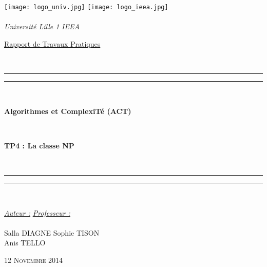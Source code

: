 \thispagestyle{cover}

\texttt{[image: logo\_univ.jpg]} \hfill \texttt{[image: logo\_ieea.jpg]} \\
~\\
\hspace*{0.5cm} {\Large \textit{Université Lille 1}} \hfill {\Large \textit{IEEA}} \hspace*{0.5cm}\\

\vspace*{17mm}

\begin{center}
	\begin{Huge} \underline{Rapport de Travaux Pratiques} \end{Huge}\\[4mm]

	\vspace*{15mm}

	\rule[0.5ex]{\linewidth}{2pt}\vspace*{-\baselineskip}\vspace*{3.2pt}
	\rule[0.5ex]{\linewidth}{1pt}\\[\baselineskip]

		\begin{Huge} \textbf{Algorithmes et ComplexiTé (ACT)} \end{Huge}\\[4mm]
		\begin{Huge} \textbf{TP4 : La classe NP} \end{Huge}\\[4mm]

	\rule[0.5ex]{\linewidth}{1pt}\vspace*{-\baselineskip}\vspace{3.2pt}
	\rule[0.5ex]{\linewidth}{2pt}\\

	\vspace*{20mm}

	{\large \textit{\underline{Auteur :}}} \hfill {\large \textit{\underline{Professeur :}}}\\
	~\\
	{\large Salla DIAGNE} \hfill {\large Sophie TISON}\\
	{\large Anis TELLO} \hfill {\large}
	
	\vspace*{20mm}
	
	{\large\textsc{12 Novembre 2014}}
\end{center}